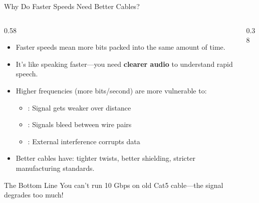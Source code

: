 \documentclass[aspectratio=169]{beamer}  %
\begin{document}
\begin{frame}{Why Do Faster Speeds Need Better Cables?}
    \begin{columns}[T]
        \begin{column}{0.58\textwidth}
            \begin{itemize}
                \item Faster speeds mean more bits packed into the same amount of time.
                \item It's like speaking faster---you need \textbf{clearer audio} to understand rapid speech.
                \item Higher frequencies (more bits/second) are more vulnerable to:
                    \begin{itemize}
                        \item {}: Signal gets weaker over distance
                        \item {}: Signals bleed between wire pairs
                        \item {}: External interference corrupts data
                    \end{itemize}
                \item Better cables have: tighter twists, better shielding, stricter manufacturing standards.
            \end{itemize}
            
            \vspace{0.3em}
            \begin{alertblock}{The Bottom Line}
                \small
                You can't run 10 Gbps on old Cat5 cable---the signal degrades too much!
            \end{alertblock}
        \end{column}
        \begin{column}{0.38\textwidth}
            \begin{center}
\end{center}
\end{column}
\end{columns}
\end{frame}
\end{document}
